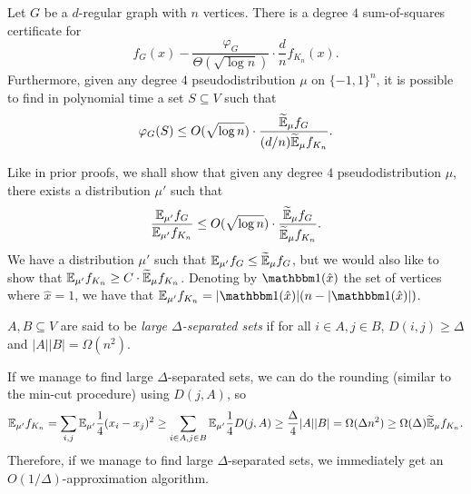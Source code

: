 	\begin{ftheo}[ARV]
		Let $G$ be a $d$-regular graph with $n$ vertices. There is a degree $4$ sum-of-squares certificate for
		\[ f_G(x) - \frac{\varphi_G}{\Theta(\sqrt{\log n})} \cdot \frac{d}{n} f_{K_n}(x). \]
		Furthermore, given any degree $4$ pseudodistribution $\mu$ on $\{-1,1\}^n$, it is possible to find in polynomial time a set $S \subseteq V$ such that
		\[ \varphi_G(S) \le O(\sqrt{\log n}) \cdot \frac{\widetilde{\mathbb{E}}_\mu f_G}{(d/n) \widetilde{\mathbb{E}}_\mu f_{K_n}}. \]
	\end{ftheo}
	Like in prior proofs, we shall show that given any degree $4$ pseudodistribution $\mu$, there exists a distribution $\mu'$ such that
	\[ \frac{\mathbb{E}_{\mu'} f_G}{\mathbb{E}_{\mu'} f_{K_n}} \le O(\sqrt{\log n}) \cdot \frac{\widetilde{\mathbb{E}}_\mu f_G}{\widetilde{\mathbb{E}}_\mu f_{K_n}}. \]
	We have a distribution $\mu'$ such that $\mathbb{E}_{\mu'} f_G \le \widetilde{\mathbb{E}}_{\mu} f_G$, but we would also like to show that $\mathbb{E}_{\mu'} f_{K_n} \ge C \cdot \widetilde{\mathbb{E}}_\mu f_{K_n}$. Denoting by $\indic(\hat{x})$ the set of vertices where $\hat{x} = 1$, we have that $\E_{\mu'} f_{K_n} = |\indic(\hat{x})|(n - |\indic(\hat{x})|)$.

	\begin{fdef}
		$A,B \subseteq V$ are said to be \emph{large $\Delta$-separated sets} if for all $i \in A, j \in B$, $D(i,j) \ge \Delta$ and $|A||B| = \Omega(n^2)$.
	\end{fdef}

	If we manage to find large $\Delta$-separated sets, we can do the rounding (similar to the min-cut procedure) using $D(j,A)$, so
	\[ \mathbb{E}_{\mu'} f_{K_n} = \sum_{i,j} \mathbb{E}_{\mu'} \frac{1}{4} (x_i - x_j)^2 \ge \sum_{i\in A,j\in B} \mathbb{E}_{\mu'} \frac{1}{4} D(j,A) \ge \frac{\Delta}{4} |A||B| = \Omega(\Delta n^2) \ge \Omega(\Delta) \widetilde{\mathbb{E}}_\mu f_{K_n}. \]
	Therefore, if we manage to find large $\Delta$-separated sets, we immediately get an $O(1/\Delta)$-approximation algorithm.


